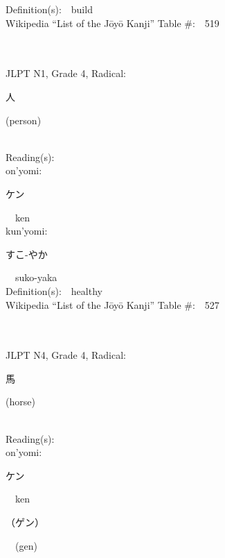 \begin{multicols}{2}
Definition(s):\ \ build \\
Wikipedia ``List of the J\=oy\=o Kanji'' Table \#:\ \ 519 \\
\ \ \\
{\fontsize{34pt}{40pt}  }\ \ \\  %
{JLPT N1, Grade 4, Radical:\ \ {\begin{CJK}{UTF8}{min} 人 \end{CJK}} (person) } \\
Reading(s):\ \ \\
{\hspace*{1em}}on'yomi:\ \ \\
{\hspace*{2em}}{\begin{CJK}{UTF8}{min} ケン \end{CJK}}\ \ ken\ \ \\
{\hspace*{1em}}kun'yomi:\ \ \\
{\hspace*{2em}}{\begin{CJK}{UTF8}{min} すこ-やか \end{CJK}}\ \ suko-yaka\ \ \\
Definition(s):\ \ healthy \\
Wikipedia ``List of the J\=oy\=o Kanji'' Table \#:\ \ 527 \\
\ \ \\
{\fontsize{34pt}{40pt}  }\ \ \\  %
{JLPT N4, Grade 4, Radical:\ \ {\begin{CJK}{UTF8}{min} 馬 \end{CJK}} (horse) } \\
Reading(s):\ \ \\
{\hspace*{1em}}on'yomi:\ \ \\
{\hspace*{2em}}{\begin{CJK}{UTF8}{min} ケン \end{CJK}}\ \ ken\ \ \\
{\hspace*{2em}}{\begin{CJK}{UTF8}{min} （ゲン） \end{CJK}}\ \ (gen)\ \ \\

\end{multicols}
